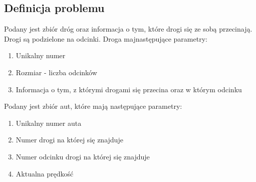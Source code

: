 \documentclass[../main.tex]{subfiles}
\begin{document}
 
\begin{figure}[bh]
\centering
 
\end{figure}

\subsection{Definicja problemu}

Podany jest zbiór dróg oraz informacja o tym, które drogi się ze sobą przecinają. Drogi są podzielone na odcinki.
Droga majnastępujące parametry:

\begin{enumerate}  
\item Unikalny numer
\item Rozmiar - liczba odcinków
\item Informacja o tym, z którymi drogami się przecina oraz w którym odcinku
\end{enumerate}


Podany jest zbiór aut, które mają następujące parametry:

\begin{enumerate}  
\item Unikalny numer auta
\item Numer drogi na której się znajduje
\item Numer odcinku drogi na której się znajduje
\item Aktualna prędkość
\end{enumerate}



\end{document}
